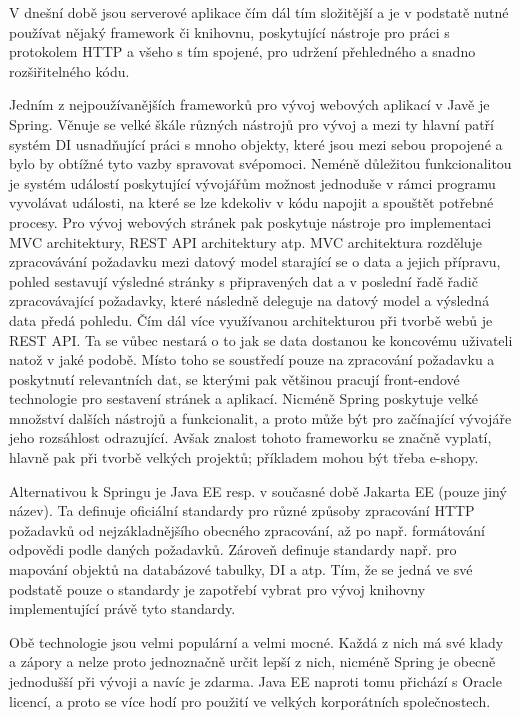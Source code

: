 		V dnešní době jsou serverové aplikace čím dál tím složitější a je v podstatě nutné používat nějaký framework
		či knihovnu, poskytující nástroje pro práci s protokolem \Ac{HTTP} a všeho s tím spojené, pro udržení
		přehledného a snadno rozšiřitelného kódu.

		Jedním z nejpoužívanějších frameworků pro vývoj webových aplikací v Javě je Spring.
		Věnuje se velké škále různých nástrojů pro vývoj a mezi ty hlavní patří systém \noindent\Ac{DI} usnadňující práci s
		mnoho objekty, které jsou mezi sebou propojené a bylo by obtížné tyto vazby spravovat svépomoci.
		Neméně důležitou funkcionalitou je systém událostí poskytující vývojářům možnost jednoduše v rámci programu vyvolávat
		události, na které se lze kdekoliv v kódu napojit a spouštět potřebné procesy. \cite{spring_framework_documentation_core}
		Pro vývoj webových stránek pak poskytuje nástroje pro implementaci \noindent\Ac{MVC}
		architektury, \noindent\Ac{REST} API architektury atp. \cite{spring_framework_documentaiton_web}
		\Ac{MVC} architektura rozděluje zpracovávání požadavku mezi datový model starající se o data a jejich přípravu,
		pohled sestavují výsledné stránky s připravených dat a v poslední řadě řadič zpracovávající požadavky,
		které následně deleguje na datový model a výsledná data předá pohledu. \cite{mvc}
		Čím dál více využívanou architekturou při tvorbě webů je \Ac{REST} API.
		Ta se vůbec nestará o to jak se data dostanou ke koncovému uživateli natož v jaké podobě.
		Místo toho se soustředí pouze na zpracování požadavku a poskytnutí relevantních dat, se kterými pak
		většinou pracují front-endové technologie pro sestavení stránek a aplikací. \cite{restfulapi}
		Nicméně Spring poskytuje velké množství dalších nástrojů a funkcionalit, a proto může být pro začínající vývojáře
		jeho rozsáhlost odrazující.
		Avšak znalost tohoto frameworku se značně vyplatí, hlavně pak při tvorbě velkých projektů; příkladem mohou být
		třeba e-shopy.

		Alternativou k Springu je Java EE resp. v současné době Jakarta EE (pouze jiný název).
		Ta definuje oficiální standardy pro různé způsoby zpracování \Ac{HTTP} požadavků od nejzákladnějšího obecného
		zpracování, až po např. formátování odpovědi podle daných požadavků.
		Zároveň definuje standardy např. pro mapování objektů na databázové tabulky, \Ac{DI} a atp.
		Tím, že se jedná ve své podstatě pouze o standardy je zapotřebí vybrat pro vývoj knihovny implementující právě tyto
		standardy. \cite{jakarta_ee}

		Obě technologie jsou velmi populární a velmi mocné.
		Každá z nich má své klady a zápory a nelze proto jednoznačně určit lepší z nich, nicméně Spring je obecně jednodušší při
		vývoji a navíc je zdarma.
		Java EE naproti tomu přichází s Oracle licencí, a proto se více hodí pro použití ve velkých korporátních
		společnostech. \cite{java_ee_vs_spring}

